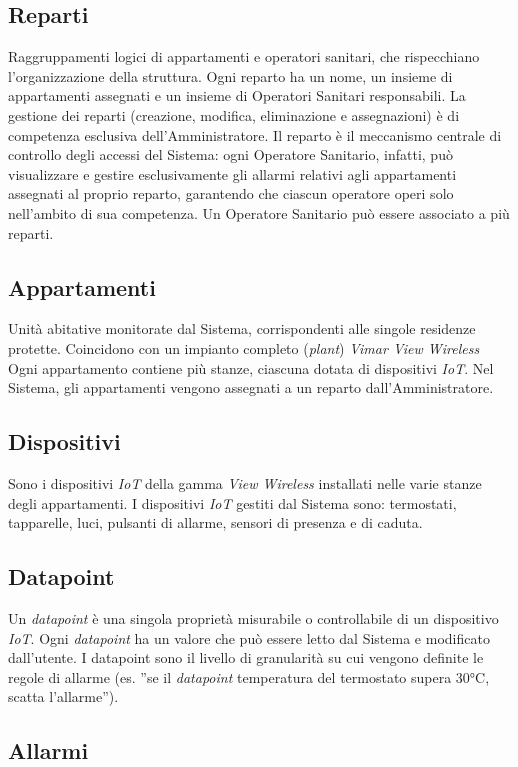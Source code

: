 \documentclass[10pt, letterpaper]{article}
\newcommand{\admin}{Amministratore\xspace}
\begin{document}
\subsection{Reparti}
Raggruppamenti logici di appartamenti e operatori sanitari, 
che rispecchiano l'organizzazione della struttura. 
Ogni reparto ha un nome, un insieme di appartamenti assegnati e un 
insieme di Operatori Sanitari responsabili. 
La gestione dei reparti (creazione, modifica, eliminazione e assegnazioni) 
è di competenza esclusiva dell'\admin.
Il reparto è il meccanismo centrale di controllo degli accessi del Sistema: 
ogni Operatore Sanitario, infatti, può visualizzare e gestire esclusivamente 
gli allarmi relativi agli appartamenti assegnati al proprio reparto, 
garantendo che ciascun operatore operi solo nell'ambito di sua competenza.
Un Operatore Sanitario può essere associato a più reparti.

\subsection{Appartamenti}
Unità abitative monitorate dal Sistema, corrispondenti alle singole 
residenze protette. Coincidono con un impianto completo (\textit{plant}) \textit{Vimar View Wireless}
Ogni appartamento contiene più stanze, ciascuna dotata di dispositivi \textit{IoT}. 
Nel Sistema, gli appartamenti vengono assegnati a un reparto dall'\admin.

\subsection{Dispositivi}
Sono i dispositivi \textit{IoT} della gamma \textit{View Wireless} installati nelle varie stanze degli appartamenti. 
I dispositivi \textit{IoT} gestiti dal Sistema sono: termostati, tapparelle, luci, pulsanti di allarme, sensori di presenza e di caduta.

\subsection{Datapoint}
Un \textit{datapoint} è una singola proprietà misurabile o controllabile di un 
dispositivo \textit{IoT}.
Ogni \textit{datapoint} ha un valore che può essere letto dal Sistema e modificato dall'utente. 
I datapoint sono il livello di granularità su cui vengono definite le regole 
di allarme (es. ''se il \textit{datapoint} temperatura del termostato supera 30°C, 
scatta l'allarme'').


\subsection{Allarmi}
\end{document}
